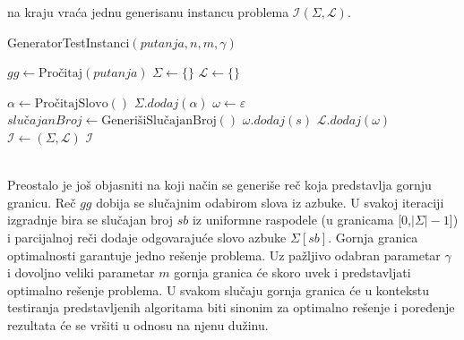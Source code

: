 \documentclass[12pt,oneside]{memoir}
\begin{document}
na kraju vraća jednu generisanu instancu problema $\mathcal{I}(\Sigma,\mathcal{L})$.
\\
\begin{algorithm}
  \caption{\textrm{GeneratorTestInstanci}$(putanja,n,m,\gamma)$}
  \label{alg:generatorTestInstanci}
  \begin{algorithmic}[1]
  \State $gg \gets \textrm{Pročitaj}(putanja)$ 
  \State $\Sigma \gets \{\}$
  \State $\mathcal{L} \gets \{\}$
  \State

    \State $\alpha \gets \textrm{PročitajSlovo}()$
    \State $\Sigma .dodaj(\alpha)$
  \EndFor
  \State
    \State $\omega \gets \varepsilon$
      \State $slu\textrm{č}ajanBroj \gets \textrm{GenerišiSlučajanBroj}()$
        \State $\omega .dodaj(s)$
      \EndIf
    \EndFor
    \State
    \State $\mathcal{L} .dodaj(\omega)$
    \State
  \EndFor
  \State
  \State $\mathcal{I} \gets (\Sigma,\mathcal{L})$
  \State
  \State \Return $\mathcal{I}$
  \end{algorithmic}
  \end{algorithm}
\\
Preostalo je još objasniti na koji način se generiše reč koja predstavlja gornju granicu.
Reč $gg$ dobija se slučajnim odabirom slova iz azbuke. U svakoj iteraciji 
izgradnje bira se slučajan broj $sb$ iz uniformne
raspodele (u granicama [0,$|\Sigma|-1$]) i parcijalnoj reči dodaje 
odgovarajuće slovo azbuke $\Sigma[sb]$.
Gornja granica optimalnosti garantuje jedno rešenje problema. Uz pažljivo odabran parametar
$\gamma$ i dovoljno veliki parametar $m$ gornja granica će skoro uvek i predstavljati
optimalno rešenje problema. U svakom slučaju gornja granica će u kontekstu testiranja
predstavljenih algoritama biti sinonim za optimalno rešenje i poređenje rezultata će se
vršiti u odnosu na njenu dužinu.
\end{document}
